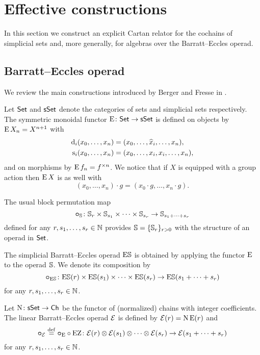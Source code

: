 
\section{Effective constructions}

In this section we construct an explicit Cartan relator for the cochains of simplicial sets and, more generally, for algebras over the Barratt--Eccles operad.

\subsection{Barratt--Eccles operad}

We review the main constructions introduced by Berger and Fresse in \cite{berger2004combinatorial}.

Let $\mathsf{Set}$ and $\mathsf{sSet}$ denote the categories of sets and simplicial sets respectively.
The symmetric monoidal functor $\operatorname{E} \colon \mathsf{Set} \to \mathsf{sSet}$ is defined on objects by $\operatorname{E} X_n = X^{n+1}$ with
\[
\begin{split}
	\operatorname{d}_i(x_0,\dots,x_n) &= (x_0,\dots,\widehat{x}_i,\dots,x_n), \\
	\operatorname{s}_i(x_0,\dots,x_n) &= (x_0, \dots, x_i, x_i, \dots, x_n),
\end{split}
\]
and on morphisms by $\operatorname{E} f_n = f^{\times n}$.
We notice that if $X$ is equipped with a group action then $\operatorname{E} X$ is as well with
\[
(x_0,\dots,x_n) \cdot g = (x_0 \cdot g, \dots, x_n \cdot g).
\]

The usual block permutation map
\[
\bm{\circ}_{\mathbb{S}} \colon \mathbb{S}_r \times \mathbb{S}_{s_1} \times \cdots \times \mathbb{S}_{s_r} \to \mathbb{S}_{s_1+\dots+s_r}
\]
defined for any $r,s_1,\dots,s_r \in \mathbb{N}$ provides $\mathbb{S} = \{\mathbb{S}_r\}_{r>0}$ with the structure of an operad in $\mathsf{Set}$.

The simplicial Barratt--Eccles operad $\mathrm{E}\mathbb{S}$ is obtained by applying the functor $\operatorname{E}$ to the operad $\mathbb{S}$.
We denote its composition by
\[
\bm{\circ}_{\mathrm{E}\mathbb{S}} \colon \mathrm{E}\mathbb{S}(r) \times \mathrm{E}\mathbb{S}(s_1) \times\dots\times \mathrm{E}\mathbb{S}(s_r) \to \mathrm{E}\mathbb{S}(s_1+\dots+s_r)
\]
for any $r,s_1,\dots,s_r \in \mathbb{N}$.

Let $\operatorname{N} \colon \mathsf{sSet} \to \mathsf{Ch}$ be the functor of (normalized) chains with integer coefficients.
The linear Barratt--Eccles operad $\mathcal{E}$ is defined by $\mathcal{E}(r) = \operatorname{N}\operatorname{E}(r)$ and
\[
\bm{\circ}_{\mathcal{E}} \stackrel{\mathrm{def}}{=} \bm{\circ}_{\operatorname{E}} \circ \operatorname{EZ} \colon \mathcal{E}(r) \otimes \mathcal{E}(s_1) \otimes\dotsb\otimes \mathcal{E}(s_r) \to \mathcal{E}(s_1+\dots+s_r)
\]
for any $r,s_1,\dots,s_r \in \mathbb{N}$.

